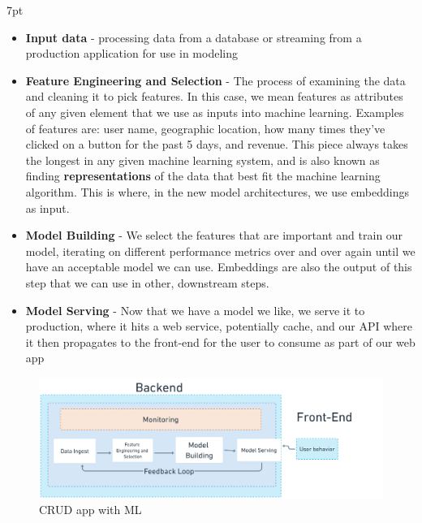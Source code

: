 \documentclass[11pt, table]{diazessay} %
\newenvironment{formal}{%
  \def\FrameCommand{%
	\hspace{1pt}%
	{\color{w_lightblue}\vrule width 2pt}%
	{\color{formalshade}\vrule width 4pt}%
	\colorbox{formalshade}%
  }%
  \MakeFramed{\advance\hsize-\width\FrameRestore}%
  \noindent\hspace{-4.55pt}%
  \begin{adjustwidth}{}{7pt}%
  \vspace{2pt}\vspace{2pt}%
}
{%
  \vspace{2pt}\end{adjustwidth}\endMakeFramed%
}
\begin{document}
\begin{sloppypar}
\begin{formal}
\begin{itemize}
  \item \textbf{Input data} - processing data from a database or streaming from a production application for use in modeling
  \item \textbf{Feature Engineering and Selection} - The process of examining the data and cleaning it to pick features. In this case, we mean features as attributes of any given element that we use as inputs into machine learning. Examples of features are: user name, geographic location, how many times they've clicked on a button for the past 5 days, and revenue. This piece always takes the longest in any given machine learning system, and is also known as finding \textbf{representations} \citep{bengio2013representation} of the data that best fit the machine learning algorithm. This is where, in the new model architectures, we use embeddings as input.
  \item \textbf{Model Building} - We select the features that are important and train our model, iterating on different performance metrics over and over again until we have an acceptable model we can use. Embeddings are also the output of this step that we can use in other, downstream steps.
  \item \textbf{Model Serving} - Now that we have a model we like, we serve it to production, where it hits a web service, potentially cache, and our API where it then propagates to the front-end for the user to consume as part of our web app
\end{itemize}
\end{formal}

\begin{figure}[H]
\centering
\includegraphics[width=1\textwidth]{figures/ml_system.png}
\caption{CRUD app with ML}
\end{figure}


\end{sloppypar}
\end{document}
